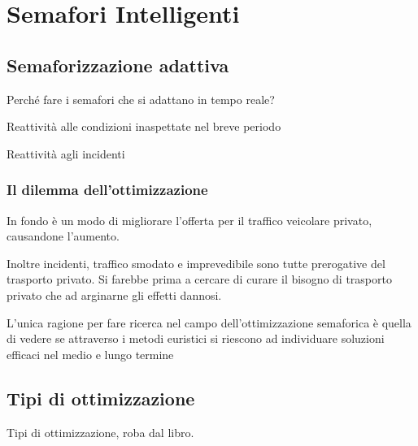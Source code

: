 \chapter{Semafori Intelligenti}
\section{Semaforizzazione adattiva}
Perché fare i semafori che si adattano in tempo reale?

Reattività alle condizioni inaspettate nel breve periodo

Reattività agli incidenti

\subsection{Il dilemma dell'ottimizzazione}
In fondo è un modo di migliorare l'offerta per il traffico veicolare privato, causandone l'aumento.

Inoltre incidenti, traffico smodato e imprevedibile sono tutte prerogative del trasporto privato. Si farebbe prima a cercare di curare il bisogno di trasporto privato che ad arginarne gli effetti dannosi.

L'unica ragione per fare ricerca nel campo dell'ottimizzazione semaforica è quella di vedere se attraverso i metodi euristici si riescono ad individuare soluzioni efficaci nel medio e lungo termine 


\section{Tipi di ottimizzazione}
Tipi di ottimizzazione, roba dal libro.

